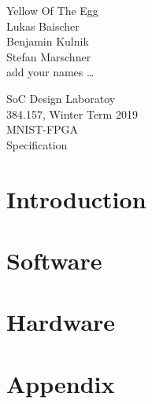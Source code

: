 \documentclass[a4paper]{article}
\begin{document}

\begin{titlepage}
	
	\begin{flushright}
		
		
		\Large 
		Yellow Of The Egg\\
		\large
		Lukas Baischer	\\
		Benjamin Kulnik	\\
		Stefan Marschner \\
		add your names \dots \\
		
	\end{flushright}
	
	\vspace{5em}
	
	\begin{center}
		{\Large SoC Design Laboratoy}\\[1em]
		{\large 384.157, Winter Term 2019} \\[5em]

		
		{\Huge MNIST-FPGA\\[.5em]
		\huge Specification}\\[10em]
	\end{center}

\end{titlepage}


\begin{acronym}
\end{acronym}
\section{Introduction}




\section{Software}








\section{Hardware}









\section*{Appendix}







\end{document}
